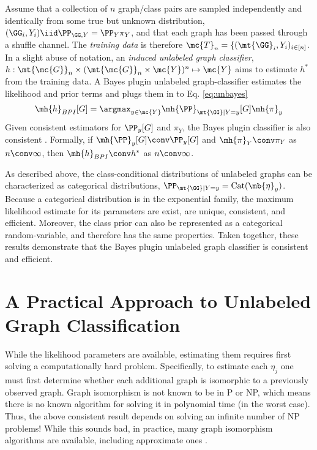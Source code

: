\documentclass[10pt,journal,cspaper,compsoc]{IEEEtran}
\begin{document}
Assume that a collection of $n$ graph/class pairs are sampled independently and identically from some true but unknown distribution, $(\GG_i,Y_i) \iid \PP_{\GG,Y}=\PP_Y \pi_Y$, and that each graph has been passed through a shuffle channel.  The \emph{training data} is therefore  $\mc{T}_n=\{(\mt{\GG}_i,Y_i)_{i\in[n]}$. 
In a slight abuse of notation, an \emph{induced unlabeled graph classifier}, $h: \mt{\mc{G}}_n \times (\mt{\mc{G}}_n \times \mc{Y})^n \mapsto \mc{Y}$ aims to estimate $h^*$ from the training data. A Bayes plugin unlabeled graph-classifier estimates the likelihood and prior terms and plugs them in to Eq. \eqref{eq:unbayes}
\begin{align}
	\mh{h}_{BPI}[G]=\argmax_{y\in\mc{Y}} \mh{\PP}_{\mt{\GG}|Y=y}[G]\mh{\pi}_y
\end{align}
Given consistent estimators for $\PP_y[G]$ and $\pi_Y$, the Bayes plugin classifier is also consistent \cite{DEV96}.  Formally, if $\mh{\PP}_y[G] \conv \PP_y[G]$ and $\mh{\pi}_Y\conv \pi_Y$ as $n \conv \infty$, then $\mh{h}_{BPI}\conv h^*$ as $n\conv \infty$.

As described above, the class-conditional distributions of unlabeled graphs can be characterized as  categorical distributions, $\PP_{\mt{\GG}|Y=y}=\text{Cat}(\mb{\eta}_y)$.  Because a categorical distribution is in the exponential family, the maximum likelihood estimate for its parameters are exist, are unique, consistent, and efficient.  Moreover, the class prior can also be represented as a categorical random-variable, and therefore has the same properties.  Taken together, these results demonstrate that the Bayes plugin unlabeled graph classifier is consistent and efficient.

\section{A Practical Approach to Unlabeled Graph Classification} %
\label{sec:a_practical_approach_to_unlabeled_graph_classification}

While the likelihood parameters are available, estimating them requires first solving a computationally hard problem.  Specifically, to estimate each $\eta_j$ one must first determine whether each additional graph is isomorphic to a previously observed graph.  Graph isomorphism is not known to be in P or NP,  which means there is no known algorithm for solving it in polynomial time (in the worst case).  Thus, the above consistent result depends on solving an infinite number of NP problems!  While this sounds bad, in practice, many graph isomorphism algorithms are available, including approximate ones \cite{Conte2004}.  
\end{document}
